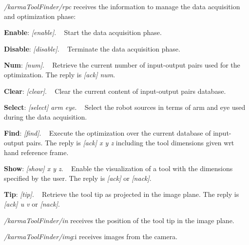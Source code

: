 \begin{DoxyItemize}
\item {\itshape /karma\+Tool\+Finder/rpc} receives the information to manage the data acquisition and optimization phase\+:
\begin{DoxyEnumerate}
\item {\bfseries Enable}\+: {\itshape \mbox{[}enable\mbox{]}}. ~\newline
 Start the data acquisition phase.
\item {\bfseries Disable}\+: {\itshape \mbox{[}disable\mbox{]}}. ~\newline
 Terminate the data acquisition phase.
\item {\bfseries Num}\+: {\itshape \mbox{[}num\mbox{]}}. ~\newline
 Retrieve the current number of input-\/output pairs used for the optimization. The reply is {\itshape \mbox{[}ack\mbox{]} num}.
\item {\bfseries Clear}\+: {\itshape \mbox{[}clear\mbox{]}}. ~\newline
 Clear the current content of input-\/output pairs database.
\item {\bfseries Select}\+: {\itshape \mbox{[}select\mbox{]} arm eye}. ~\newline
 Select the robot sources in terms of arm and eye used during the data acquisition.
\item {\bfseries Find}\+: {\itshape \mbox{[}find\mbox{]}}. ~\newline
 Execute the optimization over the current database of input-\/output pairs. The reply is {\itshape \mbox{[}ack\mbox{]} x y z} including the tool dimensions given wrt hand reference frame.
\item {\bfseries Show}\+: {\itshape \mbox{[}show\mbox{]} x y z}. ~\newline
 Enable the visualization of a tool with the dimensions specified by the user. The reply is {\itshape \mbox{[}ack\mbox{]}} or {\itshape \mbox{[}nack\mbox{]}}.
\item {\bfseries Tip}\+: {\itshape \mbox{[}tip\mbox{]}}. ~\newline
 Retrieve the tool tip as projected in the image plane. The reply is {\itshape \mbox{[}ack\mbox{]} u v} or {\itshape \mbox{[}nack\mbox{]}}.
\end{DoxyEnumerate}
\item {\itshape /karma\+Tool\+Finder/in} receives the position of the tool tip in the image plane.
\begin{DoxyItemize}
\item {\itshape /karma\+Tool\+Finder/img}\+:i receives images from the camera.

\end{DoxyItemize}
\end{DoxyItemize}
